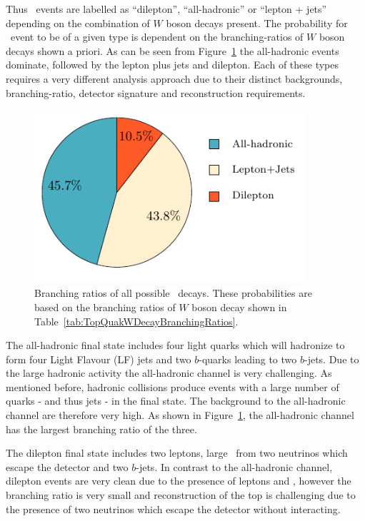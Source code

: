 {Thus \ttbar\ events are labelled as ``dilepton'', ``all-hadronic'' or ``lepton + jets'' depending on the combination of $W$ boson decays present. The probability for \ttbar\ event to be of a given type is dependent on the branching-ratios of $W$ boson decays shown a priori. As can be seen from Figure~\ref{fig:TopQuarkDecayModes} the all-hadronic events dominate, followed by the lepton plus jets and dilepton. Each of these types requires a very different analysis approach due to their distinct backgrounds, branching-ratio, detector signature and reconstruction requirements.

\begin{figure}[tbhp]
  \centering
  \includegraphics[width=0.90\textwidth]{PartTopQuark/Diagrams/TopQuarkDecayPie.pdf}
  \caption{Branching ratios of all possible \ttbar\ decays. These probabilities are based on the branching ratios of $W$ boson decay shown in Table~\ref{tab:TopQuakWDecayBranchingRatios}.}
  \label{fig:TopQuarkDecayModes}
\end{figure}

The all-hadronic final state includes four light quarks which will hadronize to form four Light Flavour (LF) jets and two $b$-quarks leading to two $b$-jets. Due to the large hadronic activity the all-hadronic channel is very challenging. As mentioned before, hadronic collisions produce events with a large number of quarks - and thus jets - in the final state. The background to the all-hadronic channel are therefore very high. As shown in Figure~\ref{fig:TopQuarkDecayModes}, the all-hadronic channel has the largest branching ratio of the three.

The dilepton final state includes two leptons, large \met\ from two neutrinos which escape the detector and two $b$-jets. In contrast to the all-hadronic channel, dilepton events are very clean due to the presence of leptons and \met, however the branching ratio is very small and reconstruction of the top is challenging due to the presence of two neutrinos which escape the detector without interacting.

}
